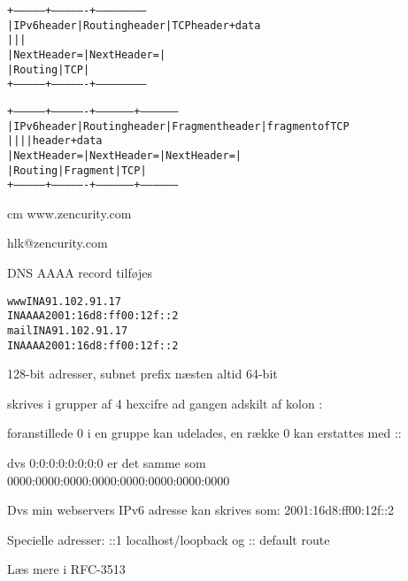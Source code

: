 \documentclass[Screen16to9,17pt]{foils}
\begin{document}
\begin{alltt}
\small
  +---------------+----------------+------------------------
  |  IPv6 header  | Routing header | TCP header + data
  |               |                |
  | Next Header = |  Next Header = |
  |    Routing    |      TCP       |
  +---------------+----------------+------------------------

  +---------------+----------------+-----------------+-----------------
  |  IPv6 header  | Routing header | Fragment header | fragment of TCP
  |               |                |                 |  header + data
  | Next Header = |  Next Header = |  Next Header =  |
  |    Routing    |    Fragment    |       TCP       |
  +---------------+----------------+-----------------+-----------------
\end{alltt}


\begin{center}
\hlkbig
{} cm
www.zencurity.com

hlk@zencurity.com

\end{center}

\pause
DNS AAAA record tilføjes

\begin{alltt}
www     IN A    91.102.91.17
        IN AAAA 2001:16d8:ff00:12f::2
mail    IN A    91.102.91.17
        IN AAAA 2001:16d8:ff00:12f::2
\end{alltt}



\begin{list2}
\item 128-bit adresser, subnet prefix næsten altid 64-bit
\item skrives i grupper af 4 hexcifre ad gangen adskilt af kolon :
\item foranstillede 0 i en gruppe kan udelades, en række 0 kan erstattes med ::
\item dvs 0:0:0:0:0:0:0:0 er det samme som \\
0000:0000:0000:0000:0000:0000:0000:0000
\item Dvs min webservers IPv6 adresse kan skrives som:
2001:16d8:ff00:12f::2
\item Specielle adresser:
::1 localhost/loopback og
::  default route
\item Læs mere i RFC-3513
\end{list2}
\end{document}
